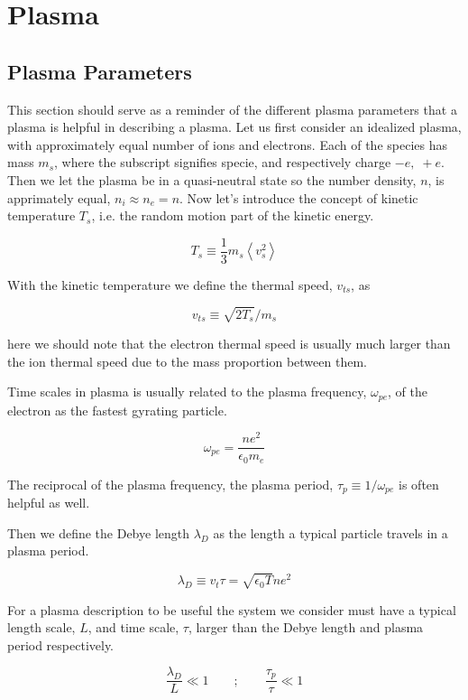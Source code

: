\section{Plasma}

    \subsection{Plasma Parameters}
        This section should serve as a reminder of the different plasma parameters
        that a plasma is helpful in describing a plasma.
        Let us first consider an idealized plasma, with approximately equal number
        of ions and electrons. Each of the species has mass \(m_s\), where the
        subscript signifies specie, and respectively charge \(-e, \; +e\). Then we let the plasma be in a quasi-neutral state
        so the number density, \(n\), is apprimately equal, \(n_i\approx n_e = n\).
        Now let's introduce the concept of kinetic temperature \(T_s\), i.e. the random
        motion part of the kinetic energy.

        \[T_s \equiv \frac{1}{3}m_s \left< v_s^2 \right> \]

        With the kinetic temperature we define the thermal speed, \(v_{ts}\), as

        \[ v_{ts} \equiv \sqrt{2T_s}/m_s \]

        here we should note that the electron thermal speed is usually much larger
        than the ion thermal speed due to the mass proportion between them.

        Time scales in plasma is usually related to the plasma frequency, \(\omega_{pe}\), of the
        electron as the fastest gyrating particle.

        \[ \omega_{pe} = \frac{ne^2}{\epsilon_0 m_e} \]

        The reciprocal of the plasma frequency, the plasma period, \(\tau_p \equiv 1/\omega_{pe}\) is often
        helpful as well.

        Then we define the Debye length \(\lambda_D\) as the length a typical particle
        travels in a plasma period.

        \[\lambda_D \equiv v_t \tau = \sqrt{\epsilon_0 T}{n e^2}\]

        For a plasma description to be useful the system we consider must have
        a typical length scale, \(L\), and time scale, \(\tau\), larger than the Debye length and plasma
        period respectively.

        \[\frac{\lambda_D}{L} \ll 1  \qquad{;} \qquad \frac{\tau_p}{\tau} \ll 1 \]

        
